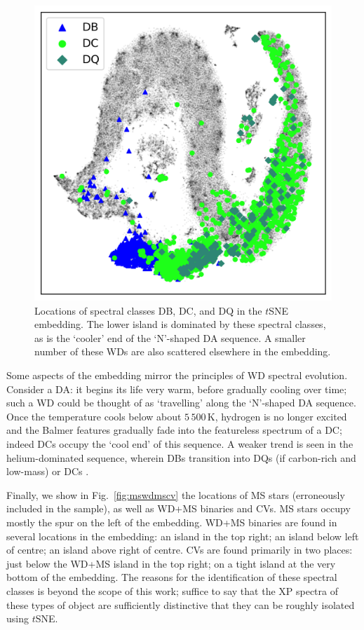 \documentclass[fleqn,usenatbib]{rasti}
\begin{document}
\begin{figure}
\centering
\includegraphics[width=\columnwidth]{figures/fig5_DBCQ.png}
\caption{
    Locations of spectral classes DB, DC, and DQ in the $t$SNE embedding.
    The lower island is dominated by these spectral classes, as is the `cooler' end of the `N'-shaped DA sequence.
    A smaller number of these WDs are also scattered elsewhere in the embedding.
}
\label{fig:DBCQ}
\end{figure}

Some aspects of the embedding mirror the principles of WD spectral evolution.
Consider a DA: it begins its life very warm, before gradually cooling over time; such a WD could be thought of as `travelling' along the `N'-shaped DA sequence.
Once the temperature cools below about $5\,500\,\text{K}$, hydrogen is no longer excited and the Balmer features gradually fade into the featureless spectrum of a DC; indeed DCs occupy the `cool end' of this sequence.
A weaker trend is seen in the helium-dominated sequence, wherein DBs transition into DQs (if carbon-rich and low-mass) or DCs \citep[e.g.][]{bedard24}.

Finally, we show in Fig.~\ref{fig:mswdmscv} the locations of MS stars (erroneously included in the sample), as well as WD+MS binaries and CVs.
MS stars occupy mostly the spur on the left of the embedding.
WD+MS binaries are found in several locations in the embedding: an island in the top right; an island below left of centre; an island above right of centre.
CVs are found primarily in two places: just below the WD+MS island in the top right; on a tight island at the very bottom of the embedding.
The reasons for the identification of these spectral classes is beyond the scope of this work; suffice to say that the XP spectra of these types of object are sufficiently distinctive that they can be roughly isolated using $t$SNE.
\end{document}
